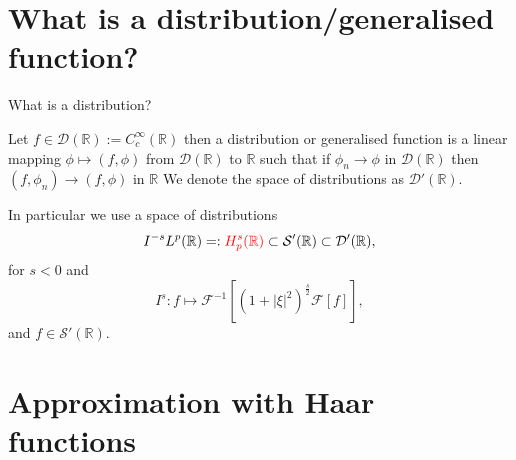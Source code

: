 \documentclass{beamer}
\begin{document}
\section{What is a distribution/generalised function?}
\begin{frame}{What is a distribution?}
        \begin{definition}[Distribution]
                Let 
                $ f \in \mathcal{D}(\mathbb{R}) := C^{\infty}_{c}(\mathbb{R}) $
                then a distribution or generalised function is a linear mapping 
                $ \phi \mapsto (f, \phi) $
                from
                $ \mathcal{D}(\mathbb{R}) $
                to
                $ \mathbb{R} $
                such that if
                $ \phi_{n} \to \phi $
                in
                $ \mathcal{D}(\mathbb{R}) $
                then
                $ (f, \phi_{n}) \to (f, \phi) $
                in
                $ \mathbb{R} $
                We denote the space of distributions as
                $ \mathcal{D}'(\mathbb{R}) $.
        \end{definition}
        \pause
        In particular we use a space of distributions
        \begin{equation*}
                I^{-s}L^p(\mathbb{R}) =: {\color{red} H^{s}_{p}(\mathbb{R})} \subset \mathcal{S}'(\mathbb{R}) \subset \mathcal{D}'(\mathbb{R}),
        \end{equation*}
        for
        $ s < 0 $
        and
        \begin{equation*}
                I^{s}: f \mapsto \mathcal{F}^{-1} \left[ \left( 1 + |\xi|^{2} \right)^{\frac{s}{2}} \mathcal{F} \left[ f \right] \right],
        \end{equation*}
        and
        $ f \in \mathcal{S}'(\mathbb{R}) $.
\end{frame}

\section{Approximation with Haar functions}
\end{document}
